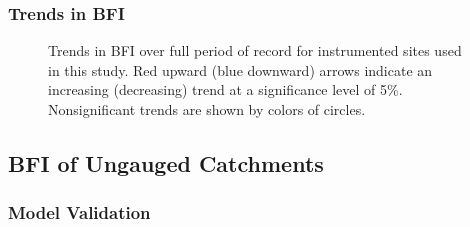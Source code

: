 \documentclass[
]{agujournal2019}
\begin{document}
\subsubsection{Trends in BFI}\label{sec-bfi-trends}

\begin{figure}


\caption{\label{fig-instrumented-trend}Trends in BFI over full period of
record for instrumented sites used in this study. Red upward (blue
downward) arrows indicate an increasing (decreasing) trend at a
significance level of 5\%. Nonsignificant trends are shown by colors of
circles.}

\end{figure}%

\subsection{BFI of Ungauged
Catchments}\label{bfi-of-ungauged-catchments}

\subsubsection{Model Validation}\label{model-validation}
\end{document}
